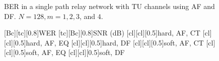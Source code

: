 \begin{figure}
{}
\caption{BER in a single path relay network with TU channels using AF and DF.  $N = 128, m = 1, 2, 3$, and $4$.}
\label{fig:sp_af_df_ber_plots_TU}
\end{figure}

\begin{figure}
    [Bc][tc][0.8]{WER}
    [tc][Bc][0.8]{SNR (dB)}
    [cl][cl][0.5]{hard, AF, CT}
    [cl][cl][0.5]{hard, AF, EQ}
    [cl][cl][0.5]{hard, DF}
    [cl][cl][0.5]{soft, AF, CT}
    [cl][cl][0.5]{soft, AF, EQ}
    [cl][cl][0.5]{soft, DF}

\centerline{
	 \\
}
\centerline{
}
\end{figure}

